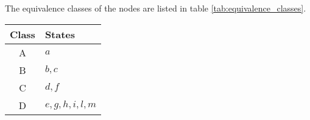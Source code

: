 The equivalence classes of the nodes are listed in table \ref{tab:equivalence_classes}.
\begin{center}
    \begin{tabular}{|c|l|}
    \hline
    \textbf{Class} & \textbf{States} \\
    \hline
    A & $a$ \\
    B & $b, c$ \\
    C & $d, f$ \\
    D & $e, g, h, i, l, m$ \\
    \hline
    \end{tabular}
    \label{tab:equivalence_classes}
\end{center}